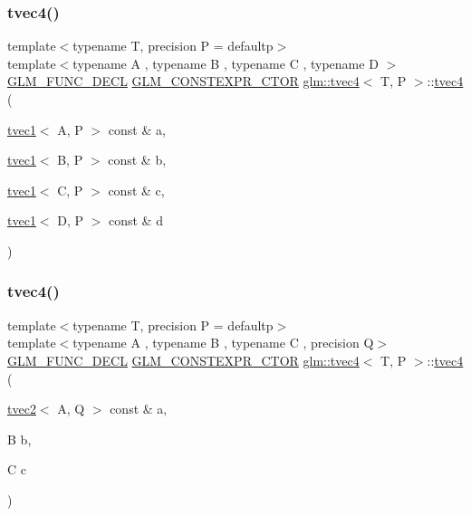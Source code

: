 \subsubsection{\texorpdfstring{tvec4()}{tvec4()}\hspace{0.1cm}{\footnotesize\ttfamily [8/35]}}
{\footnotesize\ttfamily template$<$typename T, precision P = defaultp$>$ \\
template$<$typename A , typename B , typename C , typename D $>$ \\
\mbox{\hyperlink{setup_8hpp_ab2d052de21a70539923e9bcbf6e83a51}{G\+L\+M\+\_\+\+F\+U\+N\+C\+\_\+\+D\+E\+CL}} \mbox{\hyperlink{setup_8hpp_ad34178a09666081abdb573c14d1f4a5a}{G\+L\+M\+\_\+\+C\+O\+N\+S\+T\+E\+X\+P\+R\+\_\+\+C\+T\+OR}} \mbox{\hyperlink{structglm_1_1tvec4}{glm\+::tvec4}}$<$ T, P $>$\+::\mbox{\hyperlink{structglm_1_1tvec4}{tvec4}} (\begin{DoxyParamCaption}\item[{\mbox{\hyperlink{structglm_1_1tvec1}{tvec1}}$<$ A, P $>$ const \&}]{a,  }\item[{\mbox{\hyperlink{structglm_1_1tvec1}{tvec1}}$<$ B, P $>$ const \&}]{b,  }\item[{\mbox{\hyperlink{structglm_1_1tvec1}{tvec1}}$<$ C, P $>$ const \&}]{c,  }\item[{\mbox{\hyperlink{structglm_1_1tvec1}{tvec1}}$<$ D, P $>$ const \&}]{d }\end{DoxyParamCaption})}

\mbox{\label{structglm_1_1tvec4_a15815171ac69a67c7cc91fc45d67954a}} 
\subsubsection{\texorpdfstring{tvec4()}{tvec4()}\hspace{0.1cm}{\footnotesize\ttfamily [9/35]}}
{\footnotesize\ttfamily template$<$typename T, precision P = defaultp$>$ \\
template$<$typename A , typename B , typename C , precision Q$>$ \\
\mbox{\hyperlink{setup_8hpp_ab2d052de21a70539923e9bcbf6e83a51}{G\+L\+M\+\_\+\+F\+U\+N\+C\+\_\+\+D\+E\+CL}} \mbox{\hyperlink{setup_8hpp_ad34178a09666081abdb573c14d1f4a5a}{G\+L\+M\+\_\+\+C\+O\+N\+S\+T\+E\+X\+P\+R\+\_\+\+C\+T\+OR}} \mbox{\hyperlink{structglm_1_1tvec4}{glm\+::tvec4}}$<$ T, P $>$\+::\mbox{\hyperlink{structglm_1_1tvec4}{tvec4}} (\begin{DoxyParamCaption}\item[{\mbox{\hyperlink{structglm_1_1tvec2}{tvec2}}$<$ A, Q $>$ const \&}]{a,  }\item[{B}]{b,  }\item[{C}]{c }\end{DoxyParamCaption})}




